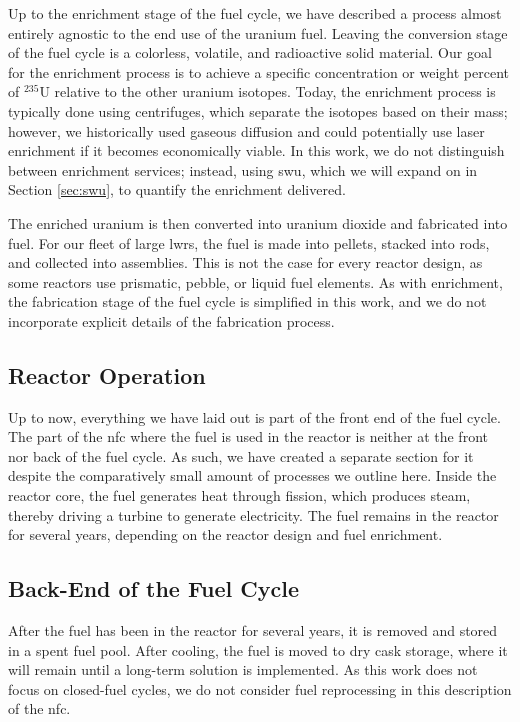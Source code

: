 Up to the enrichment stage of the fuel cycle, we have described a process
almost entirely agnostic to the end use of the uranium fuel. Leaving the
conversion stage of the fuel cycle is a colorless, volatile, and radioactive
solid material. Our goal for the enrichment process is to achieve a specific
concentration or weight percent of $^{235}$U relative to the other uranium
isotopes. Today, the enrichment process is typically done using centrifuges,
which separate the isotopes based on their mass; however, we historically used
gaseous diffusion and could potentially use laser enrichment if it becomes
economically viable. In this work, we do not distinguish between enrichment services; instead, using \gls{swu}, which we will expand on in Section
\ref{sec:swu}, to quantify the enrichment delivered.

The enriched uranium is then converted into uranium dioxide and
fabricated into fuel. For our fleet of large \glspl{lwr}, the fuel is made into
pellets, stacked into rods, and collected into assemblies. This is not the case for every reactor design, as some reactors use prismatic, pebble, or liquid fuel elements. As with enrichment, the fabrication stage of the fuel cycle is simplified in this work, and we do not incorporate explicit details of the fabrication process.

\subsection{Reactor Operation}
\label{sec:reactor_operation}
Up to now, everything we have laid out is part of the front end of the fuel
cycle. The part of the \gls{nfc} where the fuel is used in the reactor is
neither at the front nor back of the fuel cycle. As such, we have created a
separate section for it despite the comparatively small amount of processes we
outline here. Inside the reactor core, the fuel generates heat through fission,
which produces steam, thereby driving a turbine to generate electricity. The fuel remains in the reactor for several years, depending on the reactor design and fuel enrichment. %


\subsection{Back-End of the Fuel Cycle}
\label{sec:back_end}
After the fuel has been in the reactor for several years, it is removed and
stored in a spent fuel pool. After cooling, the fuel is moved to dry cask
storage, where it will remain until a long-term solution is implemented. As
this work does not focus on closed-fuel cycles, we do not consider fuel
reprocessing in this description of the \gls{nfc}.

